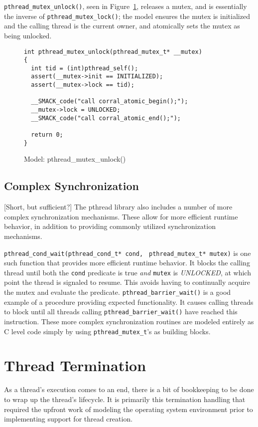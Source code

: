 \lstinline|pthread_mutex_unlock()|, seen in
Figure~\ref{fig:pthread_mutex_unlock}, releases a mutex, and is
essentially the inverse of \lstinline|pthread_mutex_lock()|; the model
ensures the mutex is initialized and the calling thread is the current
owner, and atomically sets the mutex as being unlocked. 

\begin{figure}[h]
\centering
\caption{Model: pthread\_mutex\_unlock()}
\label{fig:pthread_mutex_unlock}
\begin{lstlisting}
int pthread_mutex_unlock(pthread_mutex_t* __mutex)
{
  int tid = (int)pthread_self();
  assert(__mutex->init == INITIALIZED);
  assert(__mutex->lock == tid);

  __SMACK_code("call corral_atomic_begin();");
  __mutex->lock = UNLOCKED;
  __SMACK_code("call corral_atomic_end();");

  return 0;
}
\end{lstlisting}
\end{figure}

\subsection{Complex Synchronization}
[Short, but sufficient?]
The pthread library also includes a number of more complex
synchronization mechanisms.  These allow for more efficient runtime
behavior, in addition to providing commonly utilized synchronization
mechanisms.

\lstinline|pthread_cond_wait(pthread_cond_t* cond, |
\lstinline|pthread_mutex_t* mutex)|  is one such function that
provides more efficient runtime behavior.  It blocks the calling
thread until both the \lstinline|cond| predicate is true \emph{and}
\lstinline|mutex| is \emph{UNLOCKED}, at which point the thread is
signaled to resume. This avoids having to continually acquire the
mutex and evaluate the predicate.  \lstinline|pthread_barrier_wait()|
is a good example of a procedure providing expected functionality.  It
causes calling threads to block until all threads calling
\lstinline|pthread_barrier_wait()| have reached this instruction.
These more complex synchronization routines are modeled entirely as C
level code simply by using \lstinline|pthread_mutex_t|'s as building
blocks. 

\section{Thread Termination}
As a thread's execution comes to an end, there is a bit of bookkeeping
to be done to wrap up the thread's lifecycle.  It is primarily this
termination handling that required the upfront work of modeling the
operating system environment prior to implementing support for thread
creation.

